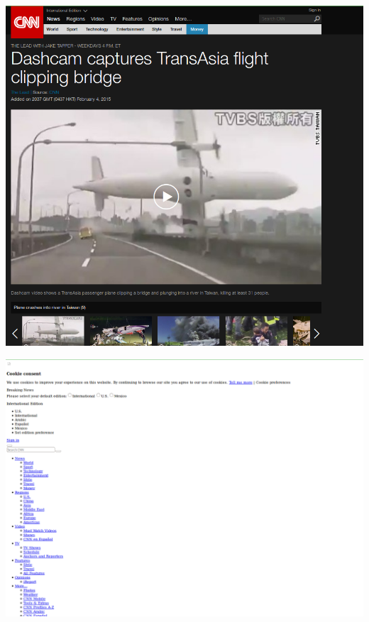 \begin{minipage}{\linewidth}
	\includegraphics[scale=0.55]{figures/playback/webrecorder_7_webrecorder.PNG}
	\label{webrecorder_7_webrecorder}
\end{minipage}
\newpage
\begin{minipage}{\linewidth}
	\includegraphics[scale=0.55]{figures/playback/webrecorder_7_wget.PNG}
	\label{webrecorder_7_wget}
\end{minipage}
